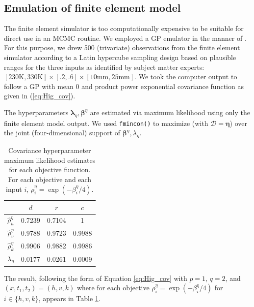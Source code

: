 \documentclass[12pt]{article}
\begin{document}
\subsection{Emulation of finite element model}\label{emulator} %
The finite element simulator is too computationally expensive to be suitable for direct use in an MCMC routine. 
%
We employed a GP emulator in the manner of \cite{Williams2006}. 
%
For this purpose, we drew 500 (trivariate) observations from the finite element simulator according to a Latin hypercube sampling design \citep{McKay1979} based on plausible ranges for the three inputs as identified by subject matter experts: $[230\mathrm{K}, 330\mathrm{K}] \times [.2,.6]\times[10\mathrm{mm},25\mathrm{mm}]$.
%
We took the computer output to follow a GP with mean 0 and product power exponential covariance function as given in (\ref{eq:Hig_cov}).
%

%
The hyperparameters $\boldsymbol\lambda_\eta,\boldsymbol \beta^\eta$ are estimated %
% 
via maximum likelihood using only the finite element model output.
% 
%
We used \texttt{fmincon()} \citep{MATLAB2017} %
to maximize (with $\mathcal D=\boldsymbol\eta$) over the joint (four-dimensional) support of $\boldsymbol \beta^\eta,\lambda_\eta$.  
%
\begin{table}[h]
\renewcommand{\arraystretch}{0.5}
\begin{center}
\begin{tabular}{|c|c|c|c|}
	\hline 
	& $d$ & $r$ & $c$ \\ 
	\hline 
$\hat\rho^\eta_h$	&0.7239 & 0.7104  & 1 \\ 
	\hline 
$\hat\rho^\eta_v$	&0.9788&  0.9723  & 0.9988 \\ 
	\hline 
$\hat\rho^\eta_k$	& 0.9906 &0.9882  & 0.9986 \\ 
	\hline 
$\lambda_\eta$	& 0.0177  & 0.0261 & 0.0009 \\ 
	\hline 
\end{tabular} 
\end{center}
\caption{Covariance hyperparameter maximum likelihood estimates for each objective function. For each objective and each input $i$, $\rho_i^\eta = \exp(-\beta^\eta_i/4)$.}
\label{table:mles}
\end{table}
%
The result, following the form of Equation \eqref{eq:Hig_cov} with $p=1$, $q=2$, and $(x,t_1,t_2)=(h,v,k)$ where for each objective $\rho^\eta_i = \exp(-\beta_i^\eta/4)$ for $i\in\{h,v,k\}$, appears in Table \ref{table:mles}.
%
\end{document}
